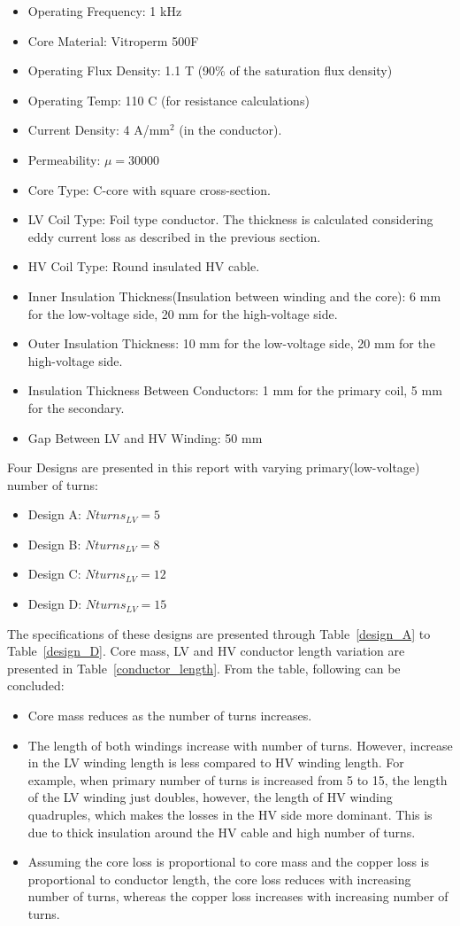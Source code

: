 \documentclass[a4paper, 11pt]{article} %
\begin{document}
\begin{itemize}
\item Operating Frequency: 1 kHz
\item Core Material: Vitroperm 500F
\item Operating Flux Density: 1.1 T (90\% of the saturation flux density)
\item Operating  Temp: 110 C (for resistance calculations)
\item Current Density: 4 A/mm$^2$ (in the conductor).
\item Permeability: $\mu = 30000$
\item Core Type: C-core with square cross-section.
\item LV Coil Type: Foil type conductor. The thickness is calculated considering eddy current loss as described in the previous section.
\item HV Coil Type: Round insulated HV cable.
\item Inner Insulation Thickness(Insulation between winding and the core): 6 mm for the low-voltage side, 20 mm for the high-voltage side.
\item Outer Insulation Thickness: 10 mm for the low-voltage side, 20 mm for the high-voltage side.
\item Insulation Thickness Between Conductors: 1 mm for the primary coil, 5 mm for the secondary.
\item Gap Between LV and HV Winding: 50 mm
\end{itemize}

Four Designs are presented in this report with varying primary(low-voltage) number of turns:

\begin{itemize}
\item Design A: $Nturns_{LV}=5$
\item Design B: $Nturns_{LV}=8$
\item Design C: $Nturns_{LV}=12$
\item Design D: $Nturns_{LV}=15$
\end{itemize}

The specifications of these designs are presented through Table~\ref{design_A} to Table~\ref{design_D}. Core mass, LV and HV conductor length variation are presented in Table~\ref{conductor_length}. From the table, following can be concluded:
\begin{itemize}
\item Core mass reduces as the number of turns increases.
\item The length of both windings increase with number of turns. However, increase in the LV winding length is less compared to HV winding length. For example, when primary number of turns is increased from  5 to 15, the length of the LV winding just doubles, however, the length of HV winding quadruples, which makes the losses in the HV side more dominant. This is due to thick insulation around the HV cable and high number of turns.
\item Assuming the core loss is proportional to core mass and the copper loss is proportional to conductor length, the core loss reduces with increasing number of turns, whereas the copper loss increases with increasing number of turns.
\end{itemize}
\end{document}

